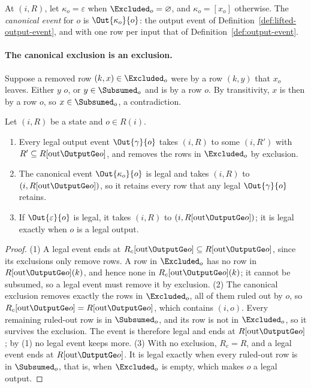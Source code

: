 \begin{definition}
\label{def:canonical-event}
At $(i,R)$, let $\kappa_o=\varepsilon$ when $\Excluded_o=\varnothing$, and
$\kappa_o=[x_o]$ otherwise.  The \emph{canonical event} for $o$ is
$\Out{\kappa_o}{o}$: the output event of
Definition~\ref{def:lifted-output-event}, and with one row per input that of
Definition~\ref{def:output-event}.
\end{definition}

\paragraph{The canonical exclusion is an exclusion.}
Suppose a removed row $(k,x)\in\Excluded_o$ were \outrelpast by a row $(k,y)$
that $x_o$ leaves.  Either $y$ \outrel $o$, or $y\in\Subsumed_o$ and is
\outrelpast by a row \outrelpart $o$.  By transitivity, $x$ is then
\outrelpast by a row \outrelpart $o$, so $x\in\Subsumed_o$, a contradiction.

\begin{lemma}
\label{lem:canonical-exclusion-normal-form}
Let $(i,R)$ be a state and $o\in R(i)$.
\begin{enumerate}
  \item Every legal output event $\Out{\gamma}{o}$ takes $(i,R)$ to some $(i,R')$ with
        $R'\subseteq R[\mathrm{out}\OutputGe o]$, and removes the rows in
        $\Excluded_o$ by exclusion.
  \item The canonical event $\Out{\kappa_o}{o}$ is legal and takes $(i,R)$ to
        $(i,R[\mathrm{out}\OutputGe o])$, so it retains every row that any legal
        $\Out{\gamma}{o}$ retains.
  \item If $\Out{\varepsilon}{o}$ is legal, it takes $(i,R)$
        to $(i,R[\mathrm{out}\OutputGe o])$; it is legal exactly when $o$ is
        a legal output.
\end{enumerate}
\end{lemma}

\begin{proof}
(1) A legal event ends at $R_c[\mathrm{out}\OutputGe o]\subseteq
R[\mathrm{out}\OutputGe o]$, since its exclusions only remove rows.  A row in
$\Excluded_o$ has no \outrelpart row in $R[\mathrm{out}\OutputGe
o](k)$, and hence none in $R_c[\mathrm{out}\OutputGe o](k)$; it cannot be
subsumed, so a legal event must remove it by exclusion.  (2) The canonical
exclusion removes exactly the rows in $\Excluded_o$, all
of them ruled out by $o$, so $R_c[\mathrm{out}\OutputGe o]=R[\mathrm{out}\OutputGe
o]$, which contains $(i,o)$.  Every remaining ruled-out row is in $\Subsumed_o$, and its
\outrelpart row is not in $\Excluded_o$, so it
survives the exclusion.  The event is therefore legal and ends at
$R[\mathrm{out}\OutputGe o]$; by (1) no legal event keeps more.  (3) With no
exclusion, $R_c=R$, and a legal event ends at $R[\mathrm{out}\OutputGe o]$.
It is legal exactly when every ruled-out row is in $\Subsumed_o$, that is, when $\Excluded_o$ is empty, which makes $o$ a legal output.
\end{proof}

